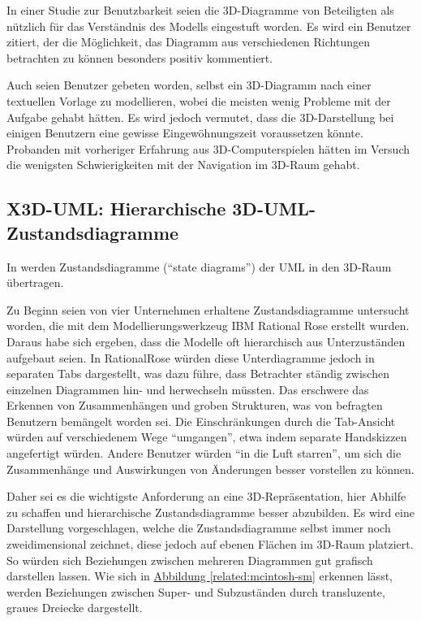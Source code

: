 \documentclass[a4paper,10pt]{sphinxmanual}
\begin{document}
In einer Studie zur Benutzbarkeit seien die 3D-Diagramme von Beteiligten als nützlich für das Verständnis des Modells eingestuft worden.
Es wird ein Benutzer zitiert, der die Möglichkeit, das Diagramm aus verschiedenen Richtungen betrachten zu können besonders positiv kommentiert.

Auch seien Benutzer gebeten worden, selbst ein 3D-Diagramm nach einer textuellen Vorlage zu modellieren, wobei die meisten wenig Probleme mit der Aufgabe gehabt hätten.
Es wird jedoch vermutet, dass die 3D-Darstellung bei einigen Benutzern eine gewisse Eingewöhnungszeit voraussetzen könnte.
Probanden mit vorheriger Erfahrung aus 3D-Computerspielen hätten im Versuch die wenigsten Schwierigkeiten mit der Navigation im 3D-Raum gehabt.


\subsection{X3D-UML: Hierarchische 3D-UML-Zustandsdiagramme}
\label{related:x3d-uml-hierarchische-3d-uml-zustandsdiagramme}\label{related:mcintosh}
In \cite{mcintosh_x3d-uml:_2008} werden Zustandsdiagramme ("`state diagrams"') der UML in den 3D-Raum übertragen.

Zu Beginn seien von vier Unternehmen erhaltene Zustandsdiagramme untersucht worden, die mit dem Modellierungswerkzeug IBM Rational Rose erstellt wurden.
Daraus habe sich ergeben, dass die Modelle oft hierarchisch aus Unterzuständen aufgebaut seien.
In RationalRose würden diese Unterdiagramme jedoch in separaten Tabs dargestellt, was dazu führe, dass Betrachter ständig zwischen einzelnen Diagrammen hin- und herwechseln müssten.
Das erschwere das Erkennen von Zusammenhängen und groben Strukturen, was von befragten Benutzern bemängelt worden sei.
Die Einschränkungen durch die Tab-Ansicht würden auf verschiedenem Wege "`umgangen"', etwa indem separate Handskizzen angefertigt würden.
Andere Benutzer würden "`in die Luft starren"', um sich die Zusammenhänge und Auswirkungen von Änderungen besser vorstellen zu können.

Daher sei es die wichtigste Anforderung an eine 3D-Repräsentation, hier Abhilfe zu schaffen und hierarchische Zustandsdiagramme besser abzubilden.
Es wird eine Darstellung vorgeschlagen, welche die Zustandsdiagramme selbst immer noch zweidimensional zeichnet, diese jedoch auf ebenen Flächen im 3D-Raum platziert.
So würden sich Beziehungen zwischen mehreren Diagrammen gut grafisch darstellen lassen.
Wie sich in \hyperref[related:mcintosh-sm]{Abbildung  \ref*{related:mcintosh-sm}} erkennen lässt, werden Beziehungen zwischen Super- und Subzuständen durch transluzente, graues Dreiecke dargestellt.
\end{document}
